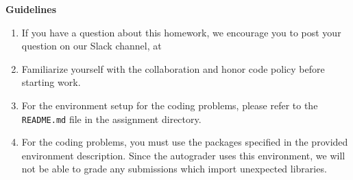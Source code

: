 {\bf Guidelines}
\begin{enumerate}[itemsep=2pt]
    \item If you have a question about this homework, we encourage you to post your question on our Slack channel, at \slack
    \item Familiarize yourself with the collaboration and honor code policy before starting work.
    \item For the environment setup for the coding problems, please refer to the \texttt{README.md} file in the assignment directory.
    \item For the coding problems, you must use the packages specified in the provided environment description.  Since the autograder uses this environment, we will not be able to grade any submissions which import unexpected libraries.
\end{enumerate}